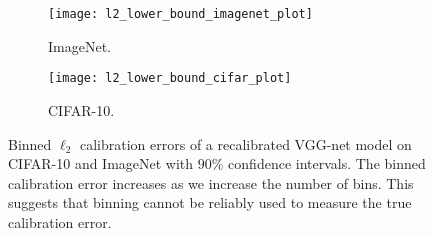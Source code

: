 
\begin{figure}
     \centering
     \begin{subfigure}[b]{0.4\textwidth}
         \centering
         \texttt{[image: l2\_lower\_bound\_imagenet\_plot]}
         \caption{ImageNet.}
         \label{fig:imagenet_lower_bound}
     \end{subfigure}
     \hfill
     \begin{subfigure}[b]{0.4\textwidth}
         \centering
         \texttt{[image: l2\_lower\_bound\_cifar\_plot]}
         \caption{CIFAR-10.}
         \label{fig:cifar_10_lower_bound}
     \end{subfigure}
        \caption{
        Binned $\ell_2$ calibration errors of a recalibrated VGG-net model on CIFAR-10 and ImageNet with $90\%$ confidence intervals. The binned calibration error increases as we increase the number of bins. This suggests that binning cannot be reliably used to measure the true calibration error.
        }
        \label{fig:lower_bounds}
\end{figure}


